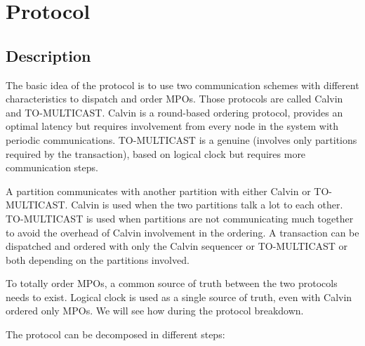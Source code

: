 \documentclass[a4paper, 10pt]{article}
\begin{document}
\section{Protocol}

\subsection{Description}\label{sec:protocol}

The basic idea of the protocol is to use two communication schemes with different characteristics to dispatch and order
MPOs. Those protocols are called Calvin and TO-MULTICAST. Calvin is a round-based ordering protocol, provides an optimal
latency but requires involvement from every node in the system with periodic communications. TO-MULTICAST is a genuine (involves only
partitions required by the transaction), based on logical clock but requires more communication steps.

A partition communicates with another partition with either Calvin or TO-MULTICAST. Calvin is used when
the two partitions talk a lot to each other. TO-MULTICAST is used when partitions are not communicating much together
to avoid the overhead of Calvin involvement in the ordering. A transaction can be dispatched and ordered with only the Calvin sequencer or
TO-MULTICAST or both depending on the partitions involved.

To totally order MPOs, a common source of truth between the two protocols needs to exist. Logical clock
is used as a single source of truth, even with Calvin ordered only MPOs. We will see how during the protocol breakdown.

The protocol can be decomposed in different steps:
\end{document}
